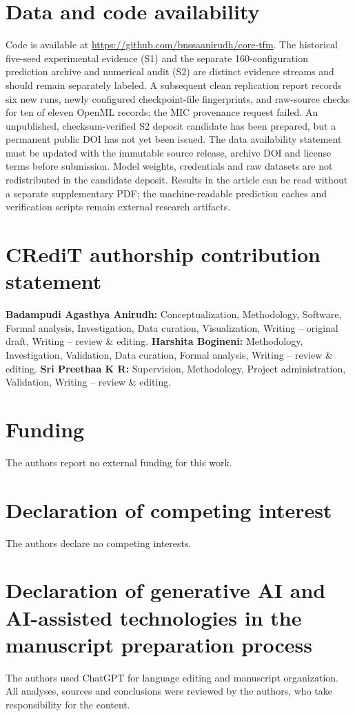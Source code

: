 \documentclass[a4paper,fleqn]{cas-sc}
\begin{document}
\section*{Data and code availability}
Code is available at \url{https://github.com/bnssaanirudh/core-tfm}. The historical five-seed experimental evidence (S1) and the separate 160-configuration prediction archive and numerical audit (S2) are distinct evidence streams and should remain separately labeled. A subsequent clean replication report records six new runs, newly configured checkpoint-file fingerprints, and raw-source checks for ten of eleven OpenML records; the MIC provenance request failed. An unpublished, checksum-verified S2 deposit candidate has been prepared, but a permanent public DOI has not yet been issued. The data availability statement must be updated with the immutable source release, archive DOI and license terms before submission. Model weights, credentials and raw datasets are not redistributed in the candidate deposit. Results in the article can be read without a separate supplementary PDF; the machine-readable prediction caches and verification scripts remain external research artifacts.

\section*{CRediT authorship contribution statement}
\textbf{Badampudi Agasthya Anirudh:} Conceptualization, Methodology, Software, Formal analysis, Investigation, Data curation, Visualization, Writing -- original draft, Writing -- review \& editing. \textbf{Harshita Bogineni:} Methodology, Investigation, Validation, Data curation, Formal analysis, Writing -- review \& editing. \textbf{Sri Preethaa K R:} Supervision, Methodology, Project administration, Validation, Writing -- review \& editing.

\section*{Funding}
The authors report no external funding for this work.

\section*{Declaration of competing interest}
The authors declare no competing interests.

\section*{Declaration of generative AI and AI-assisted technologies in the manuscript preparation process}
The authors used ChatGPT for language editing and manuscript organization. All analyses, sources and conclusions were reviewed by the authors, who take responsibility for the content.


\clearpage


\end{document}
